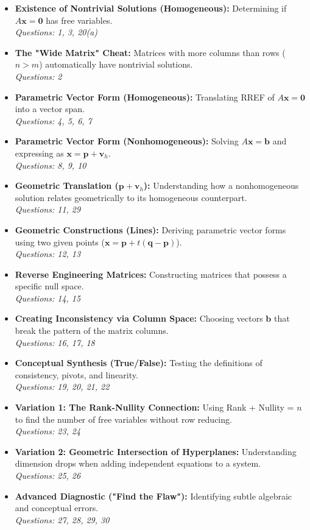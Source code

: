 \documentclass[12pt]{article}
\begin{document}
\begin{itemize}
    \item \textbf{Existence of Nontrivial Solutions (Homogeneous):} Determining if $A\mathbf{x} = \mathbf{0}$ has free variables. \\ \textit{Questions: 1, 3, 20(a)}
    \item \textbf{The "Wide Matrix" Cheat:} Matrices with more columns than rows ($n > m$) automatically have nontrivial solutions. \\ \textit{Questions: 2}
    \item \textbf{Parametric Vector Form (Homogeneous):} Translating RREF of $A\mathbf{x} = \mathbf{0}$ into a vector span. \\ \textit{Questions: 4, 5, 6, 7}
    \item \textbf{Parametric Vector Form (Nonhomogeneous):} Solving $A\mathbf{x} = \mathbf{b}$ and expressing as $\mathbf{x} = \mathbf{p} + \mathbf{v}_h$. \\ \textit{Questions: 8, 9, 10}
    \item \textbf{Geometric Translation ($\mathbf{p} + \mathbf{v}_h$):} Understanding how a nonhomogeneous solution relates geometrically to its homogeneous counterpart. \\ \textit{Questions: 11, 29}
    \item \textbf{Geometric Constructions (Lines):} Deriving parametric vector forms using two given points ($\mathbf{x} = \mathbf{p} + t(\mathbf{q} - \mathbf{p})$). \\ \textit{Questions: 12, 13}
    \item \textbf{Reverse Engineering Matrices:} Constructing matrices that possess a specific null space. \\ \textit{Questions: 14, 15}
    \item \textbf{Creating Inconsistency via Column Space:} Choosing vectors $\mathbf{b}$ that break the pattern of the matrix columns. \\ \textit{Questions: 16, 17, 18}
    \item \textbf{Conceptual Synthesis (True/False):} Testing the definitions of consistency, pivots, and linearity. \\ \textit{Questions: 19, 20, 21, 22}
    \item \textbf{Variation 1: The Rank-Nullity Connection:} Using Rank + Nullity = $n$ to find the number of free variables without row reducing. \\ \textit{Questions: 23, 24}
    \item \textbf{Variation 2: Geometric Intersection of Hyperplanes:} Understanding dimension drops when adding independent equations to a system. \\ \textit{Questions: 25, 26}
    \item \textbf{Advanced Diagnostic ("Find the Flaw"):} Identifying subtle algebraic and conceptual errors. \\ \textit{Questions: 27, 28, 29, 30}
\end{itemize}
\end{document}
